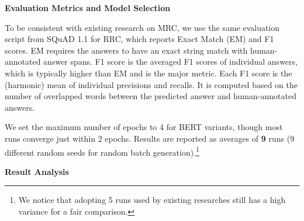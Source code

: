 \textbf{Evaluation Metrics and Model Selection}

To be consistent with existing research on MRC,
we use the same evaluation script from SQuAD 1.1 \cite{rajpurkar2016squad} for RRC, which reports Exact Match (EM) and F1 scores.
EM requires the answers to have an exact string match with human-annotated answer spans.
F1 score is the averaged F1 scores of individual answers, which is typically higher than EM and is the major metric.
Each F1 score is the (harmonic) mean of individual precisions and recalls. It is computed based on the number of overlapped words between the predicted answer and human-annotated answers.

We set the maximum number of epochs to 4 for BERT variants, though most runs converge just within 2 epochs.
Results are reported as averages of \textbf{9} runs (9 different random seeds for random batch generation).\footnote{We notice that adopting 5 runs used by existing researches still has a high variance for a fair comparison.} 

\textbf{Result Analysis}

\begin{table}[H]
    \centering
    \caption{RRC in EM (Exact Match) and F1.}
\label{chap6:tbl:result_rc}
\vspace{-3mm}
\end{table}


